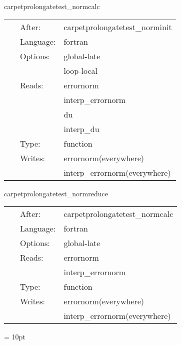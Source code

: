 \vspace{5mm}


\hspace{5mm} carpetprolongatetest\_normcalc 

\hspace{5mm}{\it calculate error norm } 


\hspace{5mm}

 \begin{tabular*}{160mm}{cll} 
~ & After:  & carpetprolongatetest\_norminit \\ 
~ & Language:  & fortran \\ 
~ & Options:  & global-late \\ 
~& ~ &loop-local\\ 
~ & Reads:  & errornorm \\ 
~& ~ &interp\_errornorm\\ 
~& ~ &du\\ 
~& ~ &interp\_du\\ 
~ & Type:  & function \\ 
~ & Writes:  & errornorm(everywhere) \\ 
~& ~ &interp\_errornorm(everywhere)\\ 
\end{tabular*} 


\vspace{5mm}


\hspace{5mm} carpetprolongatetest\_normreduce 

\hspace{5mm}{\it calculate error norm } 


\hspace{5mm}

 \begin{tabular*}{160mm}{cll} 
~ & After:  & carpetprolongatetest\_normcalc \\ 
~ & Language:  & fortran \\ 
~ & Options:  & global-late \\ 
~ & Reads:  & errornorm \\ 
~& ~ &interp\_errornorm\\ 
~ & Type:  & function \\ 
~ & Writes:  & errornorm(everywhere) \\ 
~& ~ &interp\_errornorm(everywhere)\\ 
\end{tabular*} 



\vspace{5mm}\parskip = 10pt 

